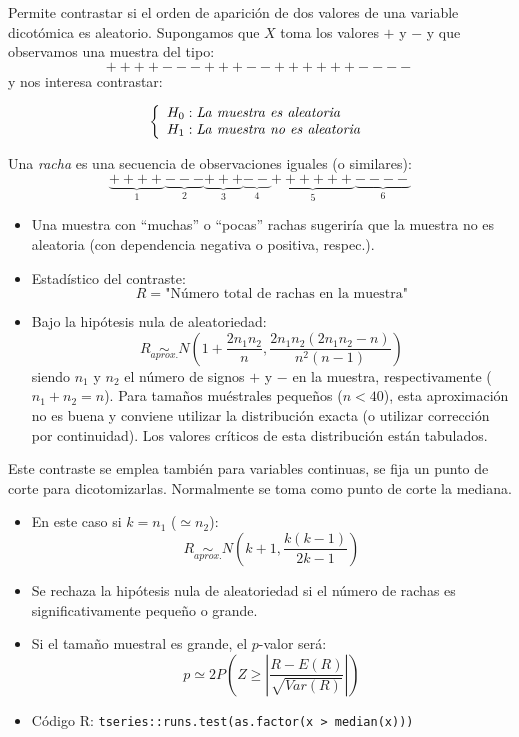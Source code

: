 \documentclass[
]{book}
\theoremstyle{break}
\theoremstyle{nonumberplain}
\begin{document}
Permite contrastar si el orden de aparición de dos valores de una
variable dicotómica es aleatorio.
Supongamos que \(X\) toma los valores \(+\) y \(-\)
y que observamos una muestra del tipo:
\[++++---+++--++++++----\]
y nos interesa contrastar:

\[\left\{ \begin{array}[c]{l}
    H_{0}:\mathit{La\ muestra\ es\ aleatoria}\\
    H_{1}:\mathit{La\ muestra\ no\ es\ aleatoria}
\end{array}
\right.\]

Una \emph{racha} es una secuencia de observaciones iguales (o
similares):
\[\underbrace{++++}_{1}\underbrace{---}_{2}\underbrace{+++}_{3}
\underbrace{--}_{4}\underbrace{++++++}_{5}\underbrace{----}_{6}\]

\begin{itemize}
\item
  Una muestra con ``muchas'' o ``pocas'' rachas sugeriría que la muestra
  no es aleatoria (con dependencia negativa o positiva, respec.).
\item
  Estadístico del contraste:
  \[R=\text{"Número total de rachas en la muestra"}\]
\item
  Bajo la hipótesis nula de aleatoriedad:
  \[R\underset{aprox.}{\sim}N\left(  1+\frac{2n_{1}n_{2}}{n},
  \frac{2n_{1}n_{2}(2n_{1}n_{2}-n)}{n^{2}(n-1)}\right)\]
  siendo \(n_{1}\) y \(n_{2}\) el número de signos \(+\) y \(-\) en la muestra,
  respectivamente (\(n_{1}+n_{2}=n\)).
  Para tamaños muéstrales pequeños (\(n<40\)), esta aproximación
  no es buena y conviene utilizar la distribución exacta (o utilizar
  corrección por continuidad). Los valores críticos de esta
  distribución están tabulados.
\end{itemize}

Este contraste se emplea también para variables continuas, se fija
un punto de corte para dicotomizarlas. Normalmente se toma como punto de corte la mediana.

\begin{itemize}
\item
  En este caso si \(k=n_{1}\) (\(\simeq n_{2}\)):
  \[R\underset{aprox.}{\sim}N\left(  k+1,\frac{k(k-1)}{2k-1}\right)\]
\item
  Se rechaza la hipótesis nula de aleatoriedad si el número de rachas
  es significativamente pequeño o grande.
\item
  Si el tamaño muestral es grande, el \(p\)-valor será:
  \[p \simeq 2 P\left( Z \geq \left\vert 
  \frac{R-E(R)}{\sqrt{Var(R)}} \right\vert \right)\]
\item
  Código R: \texttt{tseries::runs.test(as.factor(x\ \textgreater{}\ median(x)))}
\end{itemize}
\end{document}
